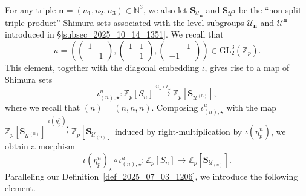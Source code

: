 \documentclass{amsart}
\numberwithin{equation}{section}
\newcommand{\Zp}{\mathbb{Z}_p}
\newcommand{\GL}{\mathrm{GL}}
\begin{document}
\subsubsection{}\label{subsec_2025_10_14_1536} For any triple $\mathbf{n}=(n_1,n_2,n_3) \in \mathbb{N}^3$, we also let $\mathbf{S}_{\mathcal{U}_\mathbf{n}}$ and $\mathbf{S}_{\mathcal{U}^{\mathbf{n}}}$ be the ``non-split triple product'' Shimura sets associated with the level subgroups $\mathcal{U}_{\mathbf{n}}$ and $\mathcal{U}^{\mathbf{n}}$ introduced in \S \ref{subsec_2025_10_14_1351}. We recall that 
\[ u = \left(  \left( \begin{smallmatrix} 1 &  \\  & 1 \end{smallmatrix} \right), \left( \begin{smallmatrix} 1 &  1 \\  & 1 \end{smallmatrix} \right),\left( \begin{smallmatrix}  &  1 \\ -1 &  \end{smallmatrix} \right)\right) \in \GL_2^3(\Zp).\]
This element, together with the diagonal embedding $\iota$, gives rise to a map of Shimura sets 
$$ \iota^u_{(n),\star} : \Zp[S_n] \xrightarrow{u_\star \circ \iota_\star} \Zp[\mathbf{S}_{\mathcal{U}^{(n)}}],$$ 
where we recall that $(n)=(n,n,n)$. Composing $\iota^u_{(n),\star}$ with the map $\Zp[\mathbf{S}_{\mathcal{U}^{(n)}}] \xrightarrow{\iota(\eta^n_p)_\star} \Zp[\mathbf{S}_{\mathcal{U}_{(n)}}]$ induced by right-multiplication by $\iota(\eta^n_p)$, we obtain a morphism
\[ \iota(\eta^n_p)_\star \circ  \iota^u_{(n),\star}: \Zp[S_n] \longrightarrow \Zp[\mathbf{S}_{\mathcal{U}_{(n)}}]. \] 
Paralleling our Definition~\ref{def_2025_07_03_1206}, we introduce the following element.
\end{document}
